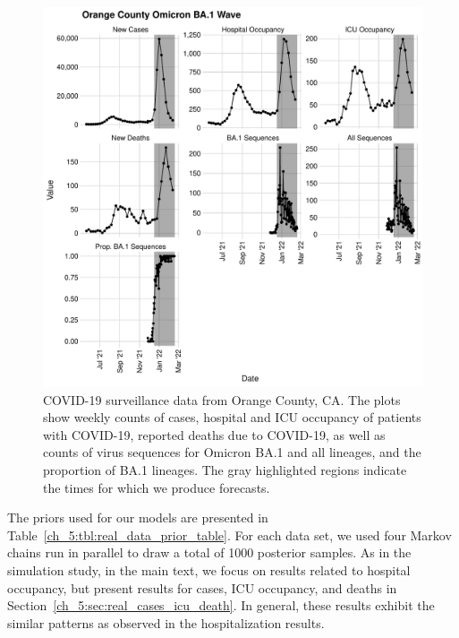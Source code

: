 \begin{figure}
    \centering
    \includegraphics[width=1.0\columnwidth]{orange_county_binned_data_plot.pdf}
    \caption[COVID-19 surveillance data from Orange County, California.]{
COVID-19 surveillance data from Orange County, CA.
The plots show weekly counts of cases, hospital and ICU occupancy of patients with COVID-19, reported deaths due to COVID-19, as well as counts of virus sequences for Omicron BA.1 and all lineages, and the proportion of BA.1 lineages.
The gray highlighted regions indicate the times for which we produce forecasts.}
    \label{ch_5:fig:orange_county_binned_data_plot}
\end{figure}

The priors used for our models are presented in Table~\ref{ch_5:tbl:real_data_prior_table}.
For each data set, we used four Markov chains run in parallel to draw a total of 1000 posterior samples.
As in the simulation study, in the main text, we focus on results related to hospital occupancy, but present results for cases, ICU occupancy, and deaths in Section~\ref{ch_5:sec:real_cases_icu_death}.
In general, these results exhibit the similar patterns as observed in the hospitalization results.

